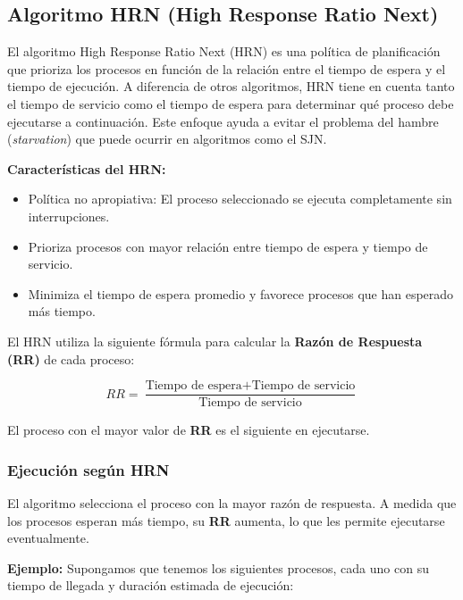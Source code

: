 \subsection{Algoritmo HRN (High Response Ratio Next)}

El algoritmo High Response Ratio Next (HRN) es una política de planificación que prioriza los procesos en función de la relación entre el tiempo de espera y el tiempo de ejecución. A diferencia de otros algoritmos, HRN tiene en cuenta tanto el tiempo de servicio como el tiempo de espera para determinar qué proceso debe ejecutarse a continuación. Este enfoque ayuda a evitar el problema del hambre (\textit{starvation}) que puede ocurrir en algoritmos como el SJN.

\textbf{Características del HRN:}
\begin{itemize}
	\item Política no apropiativa: El proceso seleccionado se ejecuta completamente sin interrupciones.
	\item Prioriza procesos con mayor relación entre tiempo de espera y tiempo de servicio.
	\item Minimiza el tiempo de espera promedio y favorece procesos que han esperado más tiempo.
\end{itemize}

El HRN utiliza la siguiente fórmula para calcular la \textbf{Razón de Respuesta (RR)} de cada proceso:

\[
RR = \frac{\text{Tiempo de espera} + \text{Tiempo de servicio}}{\text{Tiempo de servicio}}
\]

El proceso con el mayor valor de \textbf{RR} es el siguiente en ejecutarse.

\subsubsection{Ejecución según HRN}

El algoritmo selecciona el proceso con la mayor razón de respuesta. A medida que los procesos esperan más tiempo, su \textbf{RR} aumenta, lo que les permite ejecutarse eventualmente.

\textbf{Ejemplo:} Supongamos que tenemos los siguientes procesos, cada uno con su tiempo de llegada y duración estimada de ejecución:

